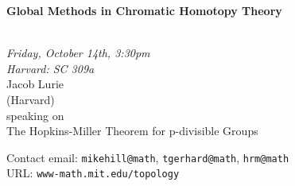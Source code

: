 \documentclass{slides}
\begin{document}
\begin{center}

{\fontsize {54pt}{40pt}\selectfont

\textrm{
{\textbf{Global Methods in Chromatic Homotopy Theory}}}
}\\
\vspace{1cm}
{\large\textrm{\emph{Friday, October 14th, 3:30pm\\Harvard: SC 309a}}}\\
\vspace{1cm}
\textrm{{\LARGE Jacob Lurie  \\[.5cm](Harvard)}}\\
\vspace{1cm} %
\textrm{speaking on}\\ %
\vspace{5mm}
\textrm{{\LARGE The Hopkins-Miller Theorem for p-divisible Groups}}\\
\end{center}
\vspace{1cm}
{\small

\textrm{Contact email: } \texttt{mikehill@math}, \texttt{tgerhard@math},
\texttt{hrm@math}\\
\textrm{URL: } \texttt{www-math.mit.edu/topology}
}
\end{document}
